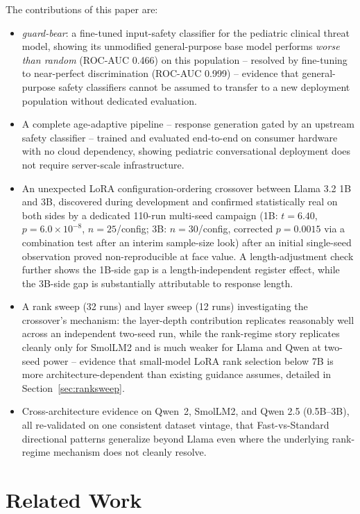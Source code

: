 \documentclass[pdflatex,sn-mathphys-num]{sn-jnl}%
\begin{document}
\medskip\noindent The contributions of this paper are:
\begin{itemize}
    \item \textit{guard-bear}: a fine-tuned input-safety classifier for the pediatric clinical threat model, showing its unmodified general-purpose base model performs \textit{worse than random} (ROC-AUC 0.466) on this population -- resolved by fine-tuning to near-perfect discrimination (ROC-AUC 0.999) -- evidence that general-purpose safety classifiers cannot be assumed to transfer to a new deployment population without dedicated evaluation.
    \item A complete age-adaptive pipeline -- response generation gated by an upstream safety classifier -- trained and evaluated end-to-end on consumer hardware with no cloud dependency, showing pediatric conversational deployment does not require server-scale infrastructure.
    \item An unexpected LoRA configuration-ordering crossover between Llama 3.2 1B and 3B, discovered during development and confirmed statistically real on both sides by a dedicated 110-run multi-seed campaign (1B: $t=6.40$, $p=6.0\times10^{-8}$, $n=25$/config; 3B: $n=30$/config, corrected $p=0.0015$ via a combination test after an interim sample-size look) after an initial single-seed observation proved non-reproducible at face value. A length-adjustment check further shows the 1B-side gap is a length-independent register effect, while the 3B-side gap is substantially attributable to response length.
    \item A rank sweep (32 runs) and layer sweep (12 runs) investigating the crossover's mechanism: the layer-depth contribution replicates reasonably well across an independent two-seed run, while the rank-regime story replicates cleanly only for SmolLM2 and is much weaker for Llama and Qwen at two-seed power -- evidence that small-model LoRA rank selection below 7B is more architecture-dependent than existing guidance assumes, detailed in Section~\ref{sec:ranksweep}.
    \item Cross-architecture evidence on Qwen~2, SmolLM2, and Qwen 2.5 (0.5B--3B), all re-validated on one consistent dataset vintage, that Fast-vs-Standard directional patterns generalize beyond Llama even where the underlying rank-regime mechanism does not cleanly resolve.
\end{itemize}

\section{Related Work}\label{sec:relatedwork}
\end{document}
